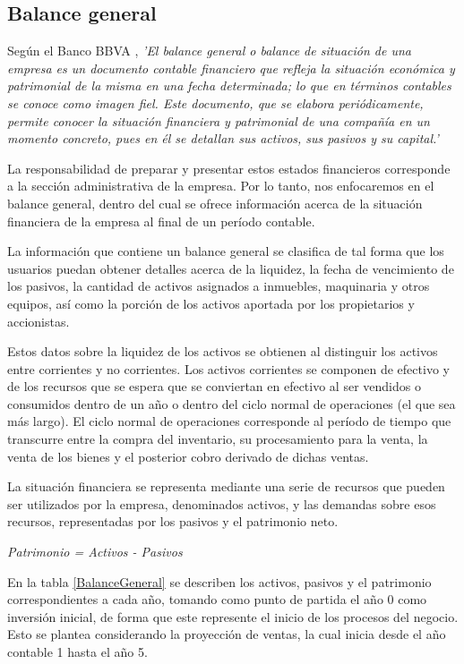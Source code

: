 {}
\subsection*{Balance general}


Según el Banco BBVA \parencite{BBVA05}, \textit{'El balance general o balance de situación de una empresa es un documento contable financiero que refleja la situación económica y patrimonial de la misma en una fecha determinada; lo que en términos contables se conoce como imagen fiel. Este documento, que se elabora periódicamente, permite conocer la situación financiera y patrimonial de una compañía en un momento concreto, pues en él se detallan sus activos, sus pasivos y su capital.'}

La responsabilidad de preparar y presentar estos estados financieros corresponde a la sección administrativa de la empresa. Por lo tanto, nos enfocaremos en el balance general, dentro del cual se ofrece información acerca de la situación financiera de la empresa al final de un período contable.

La información que contiene un balance general se clasifica de tal forma que los usuarios puedan obtener detalles acerca de la liquidez, la fecha de vencimiento de los pasivos, la cantidad de activos asignados a inmuebles, maquinaria y otros equipos, así como la porción de los activos aportada por los propietarios y accionistas.

Estos datos sobre la liquidez de los activos se obtienen al distinguir los activos entre corrientes y no corrientes. Los activos corrientes se componen de efectivo y de los recursos que se espera que se conviertan en efectivo al ser vendidos o consumidos dentro de un año o dentro del ciclo normal de operaciones (el que sea más largo). El ciclo normal de operaciones corresponde al período de tiempo que transcurre entre la compra del inventario, su procesamiento para la venta, la venta de los bienes y el posterior cobro derivado de dichas ventas.

La situación financiera se representa mediante una serie de recursos que pueden ser utilizados por la empresa, denominados activos, y las demandas sobre esos recursos, representadas por los pasivos y el patrimonio neto.

\begin{center}
	\textit{Patrimonio = Activos - Pasivos}
\end{center}

En la tabla \ref{BalanceGeneral} se describen los activos, pasivos y el patrimonio correspondientes a cada año, tomando como punto de partida el año 0 como inversión inicial, de forma que este represente el inicio de los procesos del negocio. Esto se plantea considerando la proyección de ventas, la cual inicia desde el año contable 1 hasta el año 5.

